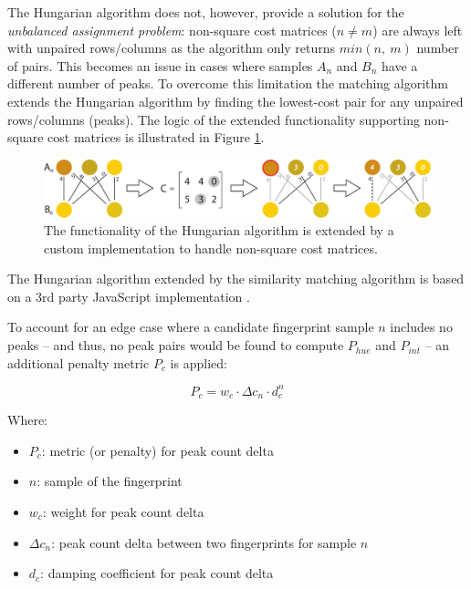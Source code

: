 \documentclass[thesis.tex]{subfiles}
\begin{document}
The Hungarian algorithm does not, however, provide a solution for the \emph{unbalanced assignment problem}: non-square cost matrices ($n \neq m$) are always left with unpaired rows/columns as the algorithm only returns $min (n,\ m)$ number of pairs. This becomes an issue in cases where samples $A_n$ and $B_n$ have a different number of peaks. To overcome this limitation the matching algorithm extends the Hungarian algorithm by finding the lowest-cost pair for any unpaired rows/columns (peaks). The logic of the extended functionality supporting non-square cost matrices is illustrated in Figure \ref{figure:hungarian-algorithm-extended}.

\begin{figure}[h]
\centering \includegraphics[width=\textwidth,height=\textheight,keepaspectratio=true]{images/design_implementation/hungarian_algorithm_ext}
\caption{The functionality of the Hungarian algorithm is extended by a custom implementation to handle non-square cost matrices.\label{figure:hungarian-algorithm-extended}}
\end{figure}

\noindent The Hungarian algorithm extended by the similarity matching algorithm is based on a 3rd party JavaScript implementation \cite{munkres-js}.

To account for an edge case where a candidate fingerprint sample $n$ includes no peaks -- and thus, no peak pairs would be found to compute $P_{hue}$ and $P_{int}$ -- an additional penalty metric $P_c$ is applied:

\begin{equation}
\label{equation:similarity-metric-no-peaks}
	P_c = w_c \cdot \Delta{c_n} \cdot d_c^n
\end{equation}

Where:
\begin{itemize}[label=]
    \item $P_c$: metric (or penalty) for peak count delta
    \item $n$: sample of the fingerprint
    \item $w_c$: weight for peak count delta
    \item $\Delta{c_n}$: peak count delta between two fingerprints for sample $n$
    \item $d_c$: damping coefficient for peak count delta
\end{itemize}
\end{document}
